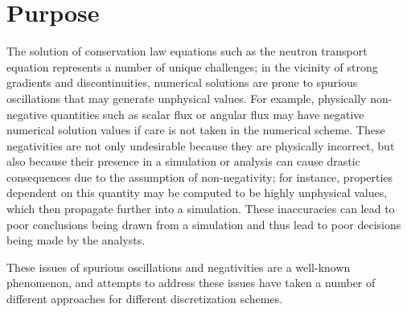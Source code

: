 \section{Purpose}
The solution of conservation law equations such as the neutron transport
equation represents a number of unique challenges; in the vicinity of strong
gradients and discontinuities, numerical solutions are prone to spurious
oscillations that may generate unphysical values. For example, physically
non-negative quantities such as scalar flux or angular flux may have negative
numerical solution values if care is not taken in the numerical scheme.
These negativities are not only undesirable because they are physically
incorrect, but also because their presence in a simulation or analysis
can cause drastic consequences due to the assumption of non-negativity;
for instance, properties dependent on this quantity may be computed
to be highly unphysical values, which then propagate further into
a simulation. These inaccuracies can lead to poor conclusions being drawn
from a simulation and thus lead to poor decisions being made by the analysts.

These issues of spurious oscillations and negativities are a well-known
phenomenon, and attempts to address these issues have taken a number
of different approaches for different discretization schemes.
